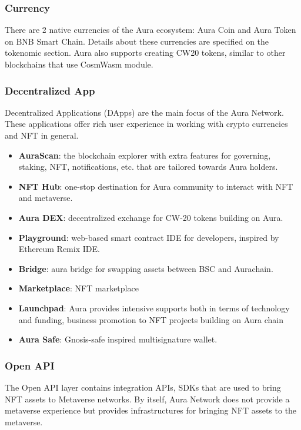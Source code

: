 \documentclass[11pt, titlepage]{article}
\begin{document}
\subsubsection*{Currency}
There are 2 native currencies of the Aura ecosystem: Aura Coin and Aura Token on BNB Smart Chain. Details about these currencies are specified on the tokenomic section. Aura also supports creating CW20 tokens, similar to other blockchains that use CosmWasm module.

\subsubsection*{Decentralized App}
Decentralized Applications (DApps) are the main focus of the Aura Network. These applications offer rich user experience in working with crypto currencies and NFT in general.

\begin{itemize}
    \item \textbf{AuraScan}: the blockchain explorer with extra features for governing, staking, NFT, notifications, etc. that are tailored towards Aura holders. 
    \item \textbf{NFT Hub}: one-stop destination for Aura community to interact with NFT and metaverse.
    \item \textbf{Aura DEX}: decentralized exchange for CW-20 tokens building on Aura.
    \item \textbf{Playground}: web-based smart contract IDE for developers, inspired by Ethereum Remix IDE.
    \item \textbf{Bridge}: aura bridge for swapping assets between BSC and Aurachain.
    \item \textbf{Marketplace}: NFT marketplace
    \item \textbf{Launchpad}: Aura provides intensive supports both in terms of technology and funding, business promotion to NFT projects building on Aura chain
    \item \textbf{Aura Safe}: Gnosis-safe inspired multisignature wallet.
\end{itemize}

\subsubsection*{Open API}
The Open API layer contains integration APIs, SDKs that are used to bring NFT assets to Metaverse networks. By itself, Aura Network does not provide a metaverse experience but provides infrastructures for bringing NFT assets to the metaverse.
\end{document}
